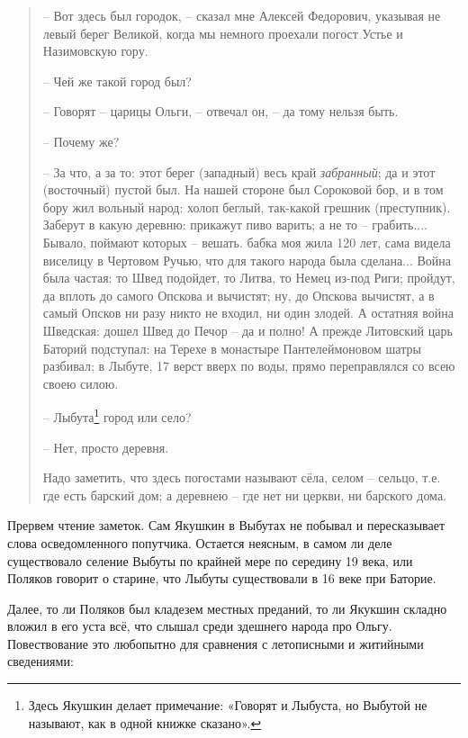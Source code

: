 \begin{quotation}
 – Вот здесь был городок, – сказал мне Алексей Федорович, указывая не левый берег Великой, когда мы немного проехали погост Устье и Назимовскую гору.

 – Чей же такой город был?

 – Говорят – царицы Ольги, – отвечал он, – да тому нельзя быть.

 – Почему же?

 – За что, а за то: этот берег (западный) весь край \textit{забранный}; да и этот (восточный) пустой был. На нашей стороне был Сороковой бор, и в том бору жил вольный народ: холоп беглый, так-какой грешник (преступник). Заберут в какую деревню: прикажут пиво варить; а не то – грабить.... Бывало, поймают которых – вешать. бабка моя жила 120 лет, сама видела виселицу в Чертовом Ручью, что для такого народа была сделана... Война была частая: то Швед подойдет, то Литва, то Немец из-под Риги; пройдут, да вплоть до самого Опскова и вычистят; ну, до Опскова вычистят, а в самый Опсков ни разу никто не входил, ни один злодей. А остатняя война Шведская: дошел Швед до Печор – да и полно! А прежде Литовский царь Баторий подступал: на Терехе в монастыре Пантелеймоновом шатры разбивал; в Лыбуте, 17 верст вверх по воды, прямо переправлялся со всею своею силою.

 – Лыбута\footnote{Здесь Якушкин делает примечание: «Говорят и Лыбуста, но Выбутой не называют, как в одной книжке сказано».} город или село?

 – Нет, просто деревня.

Надо заметить, что здесь погостами называют сёла, селом – сельцо, т.е. где есть барский дом; а деревнею – где нет ни церкви, ни барского дома.
\end{quotation}

Прервем чтение заметок. Сам Якушкин в Выбутах не побывал и пересказывает слова осведомленного попутчика. Остается неясным, в самом ли деле существовало селение Выбуты по крайней мере по середину 19 века, или Поляков говорит о старине, что Лыбуты существовали в 16 веке при Баторие.

Далее, то ли Поляков был кладезем местных преданий, то ли Якукшин складно вложил в его уста всё, что слышал среди здешнего народа про Ольгу. Повествование это любопытно для сравнения с летописными и житийными сведениями:

